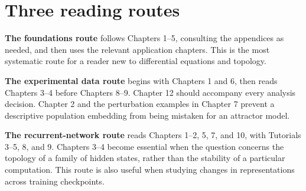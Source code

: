 \section*{Three reading routes}
\textbf{The foundations route} follows Chapters 1--5, consulting the appendices as needed, and then uses the relevant application chapters. This is the most systematic route for a reader new to differential equations and topology.

\textbf{The experimental data route} begins with Chapters 1 and 6, then reads Chapters 3--4 before Chapters 8--9. Chapter 12 should accompany every analysis decision. Chapter 2 and the perturbation examples in Chapter 7 prevent a descriptive population embedding from being mistaken for an attractor model.

\textbf{The recurrent-network route} reads Chapters 1--2, 5, 7, and 10, with Tutorials 3--5, 8, and 9. Chapters 3--4 become essential when the question concerns the topology of a family of hidden states, rather than the stability of a particular computation. This route is also useful when studying changes in representations across training checkpoints.

